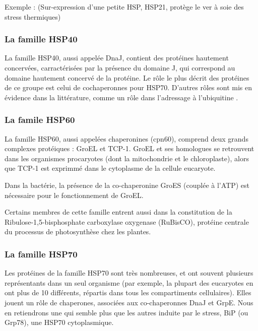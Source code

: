   Exemple : \cite{liu2013} (Sur-expression d’une petite HSP, HSP21, protège le
  ver à soie des stress thermiques)

\subsubsection{La famille HSP40} %
\label{ssub:la_famille_hsp40}

  La famille HSP40, aussi appelée DnaJ, contient des protéines hautement
  concervées, carractérisées par la présence du domaine J, qui correspond au
  domaine hautement concervé de la protéine. Le rôle le plus décrit des
  protéines de ce groupe est celui de cochaperonnes pour HSP70. D'autres rôles
  sont mis en évidence dans la littérature, comme un rôle dans l'adressage à
  l'ubiquitine \cite{lee1996}.

\subsubsection{La famile HSP60} %
\label{ssub:la_famile_hsp60}

  La famille HSP60, aussi appelées chaperonines (cpn60), comprend deux grands
  complexes protéiques : GroEL et TCP-1. GroEL et ses homologues se retrouvent
  dans les organismes procaryotes (dont la mitochondrie et le chloroplaste),
  alors que TCP-1 est exprimmé dans le cytoplasme de la cellule eucaryote.

  Dans la bactérie, la présence de la co-chaperonine GroES (couplée à l'ATP)
  est nécessaire pour le fonctionnement de GroEL.

  Certains membres de cette famille entrent aussi dans la constitution de la
  Ribulose-1,5-bisphosphate carboxylase oxygenase (RuBisCO), protéine centrale
  du processus de photosynthèse chez les plantes.

\subsubsection{La famille HSP70} %
\label{ssub:la_famille_hsp70}

  Les protéines de la famille HSP70 sont très nombreuses, et ont souvent
  plusieurs représentants dans un seul organisme (par exemple, la plupart des
  eucaryotes en ont plus de 10 différents, répartis dans tous les
  compartiments cellulaires). Elles jouent un rôle de chaperones, associées
  aux co-chaperonnes DnaJ et GrpE. Nous en retiendrons une qui semble plus que
  les autres induite par le stress, BiP (ou Grp78), une HSP70 cytoplasmique.

